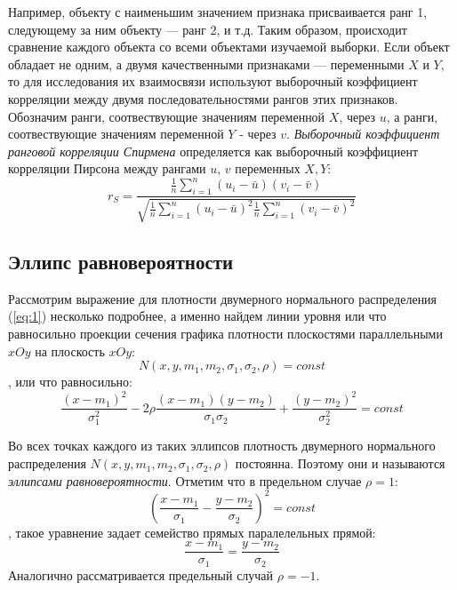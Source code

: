 \documentclass[12pt,a4paper]{article}
\begin{document}
Например, объекту с наименьшим значением признака присваивается ранг 1, следующему за ним объекту — ранг 2, и т.д. Таким образом, происходит сравнение каждого объекта со всеми объектами изучаемой выборки. Если объект обладает не одним, а двумя качественными признаками — переменными $X$ и $Y$, то для исследования их взаимосвязи используют выборочный коэффициент корреляции между двумя последовательностями рангов этих признаков. \\

Обозначим ранги, соотвествующие значениям переменной $X$, через $u$, а ранги, соотвествующие значениям переменной $Y$ - через $v$. \textit{Выборочный коэффициент ранговой корреляции Спирмена} определяется как выборочный коэффициент корреляции Пирсона между рангами $u$, $v$ переменных $X, Y$:
\begin{equation}
	r_S = \frac
			{\frac{1}{n} \sum_{i=1}^{n}{(u_i - \bar{u})(v_i - \bar{v})}}
			{\sqrt{\frac{1}{n} \sum_{i=1}^{n}{(u_i-\bar{u})^2}
					\frac{1}{n} \sum_{i=1}^{n}{(v_i-\bar{v})^2}}}
\end{equation}

\subsection{Эллипс равновероятности}
Рассмотрим выражение для плотности двумерного нормального распределения (\ref{eq:1}) несколько подробнее, а именно найдем линии уровня или что равносильно проекции сечения графика плотности плоскостями параллельными $xOy$ на плоскость $xOy$:
$$N(x, y, m_1, m_2, \sigma_1, \sigma_2, \rho) = const$$
, или что равносильно:
\begin{equation}
	\frac{(x - m_1)^2}{\sigma_1^2} - 2\rho\frac{(x - m_1)(y - m_2)}{\sigma_1\sigma_2} + \frac{(y - m_2)^2}{\sigma_2^2} = const
\end{equation}

Во всех точках каждого из таких эллипсов плотность двумерного нормального распределения $N(x, y, m_1, m_2, \sigma_1, \sigma_2, \rho)$ постоянна. Поэтому они и называются \textit{эллипсами равновероятности}\cite[стр. 44-45]{ventzel}. Отметим что в предельном случае $\rho = 1$:
$$\left(\frac{x-m_1}{\sigma_1} - \frac{y-m_2}{\sigma_2}\right)^2 = const$$
, такое уравнение задает семейство прямых паралелельных прямой:
\begin{equation}\label{eq:10}
	\frac{x-m_1}{\sigma_1} = \frac{y-m_2}{\sigma_2}
\end{equation}
Аналогично рассматривается предельный случай $\rho = -1$.
\pagebreak
\end{document}
